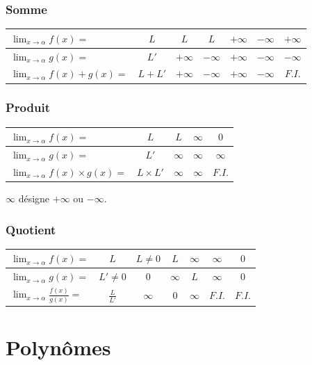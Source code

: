 \documentclass[12]{article}%
\theoremstyle{plain}
\theoremstyle{definition}
\theoremstyle{remark}
\begin{document}
\subsubsection{Somme}
\begin{tabular}{|l|c|c|c|c|c|c|}
	\hline
	$\displaystyle \lim_{x \to \alpha} f(x) = $ & $L$ & $L$ & $L$ & $+\infty$ & $-\infty$ & $+\infty$ \\
	\hline
	$\displaystyle \lim_{x \to \alpha} g(x) = $ & $L'$ & $+\infty$ & $-\infty$ & $+\infty$ & $-\infty$ & $-\infty$ \\
	\hline
	$\displaystyle \lim_{x \to \alpha} f(x)+g(x) = $ & $L+L'$ & $+\infty$ & $-\infty$ & $+\infty$ & $-\infty$ & $F.I.$ \\
	\hline
\end{tabular}

\subsubsection{Produit}
\begin{tabular}{|l|c|c|c|c|}
	\hline
	$\displaystyle \lim_{x \to \alpha} f(x) = $ & $L$ & $L$ & $\infty$ & $0$ \\
	\hline
	$\displaystyle \lim_{x \to \alpha} g(x) = $ & $L'$ & $\infty$ & $\infty$ & $\infty$ \\
	\hline
	$\displaystyle \lim_{x \to \alpha} f(x) \times g(x) = $ & $L \times L'$ & $\infty$ & $\infty$ & $F.I.$ \\
	\hline
\end{tabular}

$\infty$ désigne $+\infty$ ou $-\infty$.

\subsubsection{Quotient}
\begin{tabular}{|l|c|c|c|c|c|c|}
	\hline
	$\displaystyle \lim_{x \to \alpha} f(x) = $ & $L$ & $L \ne 0$ & $L$ & $\infty$ & $\infty$ & $0$ \\
	\hline
	$\displaystyle \lim_{x \to \alpha} g(x) = $ & $L' \ne 0$ & $0$ & $\infty$ & $L$ & $\infty$ & $0$ \\
	\hline
	$\displaystyle \lim_{x \to \alpha} \frac{f(x)}{g(x)} = $ & $\frac{L}{L'}$ & $\infty$ & $0$ & $\infty$ & $F.I.$ & $F.I.$ \\
	\hline
\end{tabular}


\newpage
\section{Polynômes}
\end{document}
